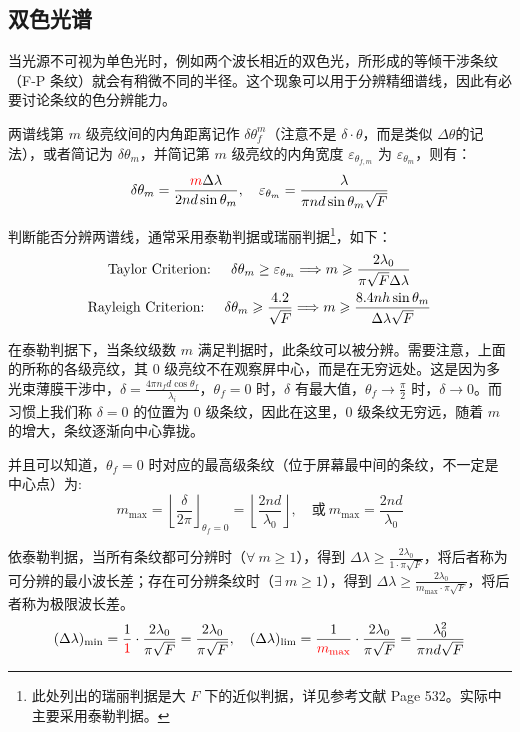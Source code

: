 \documentclass[UTF8]{report}
\theoremstyle{MyLineTheoremStyle} %
\theoremstyle{MyBlockTheoremStyle} %
\theoremstyle{MySubsubsectionStyle} %
\begin{document}
\subsection{双色光谱}

当光源不可视为单色光时，例如两个波长相近的双色光，所形成的等倾干涉条纹（F-P 条纹）就会有稍微不同的半径。这个现象可以用于分辨精细谱线，因此有必要讨论条纹的色分辨能力。

两谱线第 $m$ 级亮纹间的内角距离记作 $\delta \theta_f^m$（注意不是 $\delta \cdot \theta$，而是类似 $\Delta \theta$的记法），或者简记为 $\delta \theta_m$，并简记第 $m$ 级亮纹的内角宽度 $\varepsilon_{\theta_{f, m}}$ 为 $\varepsilon_{\theta_m}$，则有：
\begin{equation}
\delta \theta_m = \frac{{\color{red} m} \Delta \lambda}{2nd\sin \theta_m},\quad \varepsilon_{\theta_m} = \frac{\lambda}{\pi n d \sin \theta_m\sqrt{F}}
\end{equation}

判断能否分辨两谱线，通常采用泰勒判据或瑞丽判据\footnote{此处列出的瑞丽判据是大 $F$ 下的近似判据，详见参考文献 \cite{Optics} Page 532。实际中主要采用泰勒判据。}，如下：
\begin{gather}
    \text{Taylor Criterion: \quad } \delta \theta_m \geq \varepsilon_{\theta_m} \Longrightarrow m \geqslant \frac{2\lambda_0}{\pi \sqrt{F} \Delta \lambda}
    \\
    \text{Rayleigh Criterion: \quad } \delta \theta_m \geqslant \frac{4.2}{\sqrt{F}} \Longrightarrow m \geqslant \frac{8.4 n h \sin \theta_m}{\Delta \lambda \sqrt{F} }
\end{gather}

在泰勒判据下，当条纹级数 $m$ 满足判据时，此条纹可以被分辨。需要注意，上面的所称的各级亮纹，其 0 级亮纹不在观察屏中心，而是在无穷远处。这是因为多光束薄膜干涉中，$\delta = \frac{4 \pi n_f d \cos \theta_f}{\lambda_i}$，$\theta_f = 0$ 时，$\delta $ 有最大值，$\theta_f \to \frac{\pi}{2}$ 时，$\delta \to 0$。而习惯上我们称 $\delta = 0$ 的位置为 0 级条纹，因此在这里，0 级条纹无穷远，随着 $m$ 的增大，条纹逐渐向中心靠拢。

并且可以知道，$\theta_f = 0$ 时对应的最高级条纹（位于屏幕最中间的条纹，不一定是中心点）为:
\begin{equation}
m_{\max} =  \left \lfloor \frac{\delta}{2\pi} \right \rfloor_{\theta_f = 0} = \left \lfloor \frac{2nd}{\lambda_0} \right \rfloor,\quad \text{或}\  m_{\max} = \frac{2nd}{\lambda_0}
\end{equation}

依泰勒判据，当所有条纹都可分辨时（$\forall\ m \geqslant 1$），得到 $\Delta \lambda \geqslant \frac{2\lambda_0}{1\cdot \pi \sqrt{F}}$，将后者称为可分辨的最小波长差；存在可分辨条纹时（$\exists\ m \geqslant 1$），得到 $\Delta \lambda \geqslant \frac{2\lambda_0}{m_{\max}\cdot \pi \sqrt{F}}$，将后者称为极限波长差。
\begin{equation}
    (\Delta \lambda)_{\min} = \frac{1}{{\color{red} 1}}\cdot \frac{2\lambda_0}{\pi \sqrt{F}} = \frac{2\lambda_0}{\pi \sqrt{F}}
    ,\quad 
    (\Delta \lambda)_{\lim} = \frac{1}{{\color{red} m_{\max}}}\cdot \frac{2\lambda_0}{\pi \sqrt{F}} = \frac{\lambda_0^2}{\pi n d \sqrt{F}  }
\end{equation}
\end{document}
